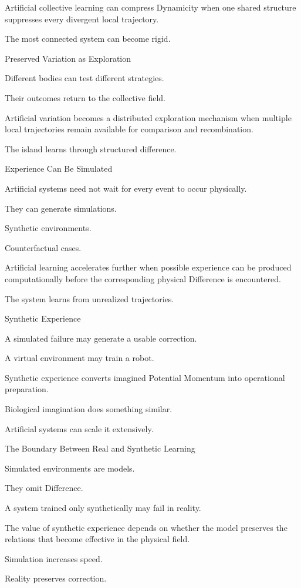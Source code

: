 Artificial collective learning can compress Dynamicity when one shared structure suppresses every divergent local trajectory.

The most connected system can become rigid.

Preserved Variation as Exploration

Different bodies can test different strategies.

Their outcomes return to the collective field.

Artificial variation becomes a distributed exploration mechanism when multiple local trajectories remain available for comparison and recombination.

The island learns through structured difference.

Experience Can Be Simulated

Artificial systems need not wait for every event to occur physically.

They can generate simulations.

Synthetic environments.

Counterfactual cases.

Artificial learning accelerates further when possible experience can be produced computationally before the corresponding physical Difference is encountered.

The system learns from unrealized trajectories.

Synthetic Experience

A simulated failure may generate a usable correction.

A virtual environment may train a robot.

Synthetic experience converts imagined Potential Momentum into operational preparation.

Biological imagination does something similar.

Artificial systems can scale it extensively.

The Boundary Between Real and Synthetic Learning

Simulated environments are models.

They omit Difference.

A system trained only synthetically may fail in reality.

The value of synthetic experience depends on whether the model preserves the relations that become effective in the physical field.

Simulation increases speed.

Reality preserves correction.

